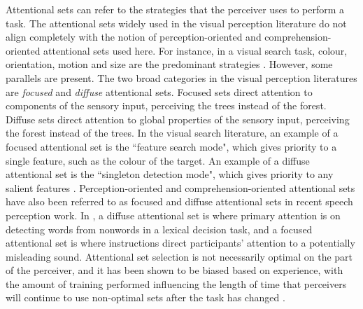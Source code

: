 Attentional sets can refer to the strategies that the perceiver uses to perform a task.
The attentional sets widely used in the visual perception literature do not align completely with the notion of perception-oriented and comprehension-oriented attentional sets used here.
For instance, in a visual search task, colour, orientation, motion and size are the predominant strategies \citep{Wolfe2004}.
However, some parallels are present.
The two broad categories in the visual perception literatures are \emph{focused} and \emph{diffuse} attentional sets.
Focused sets direct attention to components of the sensory input, perceiving the trees instead of the forest. 
Diffuse sets direct attention to global properties of the sensory input, perceiving the forest instead of the trees.  
In the visual search literature, an example of a focused attentional set is the ``feature search mode", which gives priority to a single feature, such as the colour of the target. An example of a diffuse attentional set is the ``singleton detection mode", which gives priority to any salient features \citep{Bacon1994}.
Perception-oriented and comprehension-oriented attentional sets have also been referred to as focused and diffuse attentional sets in recent speech perception work.
In \citet{Pitt2012}, a diffuse attentional set is where primary attention is on detecting words from nonwords in a lexical decision task, and a focused attentional set is where instructions direct participants' attention to a potentially misleading sound.
Attentional set selection is not necessarily optimal on the part of the perceiver, and it has been shown to be biased based on experience, with the amount of training performed influencing the length of time that perceivers will continue to use non-optimal sets after the task has changed \citep{Leber2006}.

